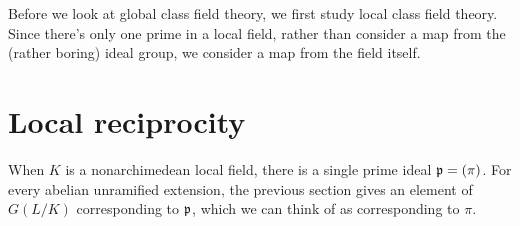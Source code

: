 Before we look at global class field theory, we first study local class field theory. Since there's only one prime in a local field, rather than consider a map from the (rather boring) ideal group, we consider a map from the field itself.
\section{Local reciprocity}
When $K$ is a nonarchimedean local field, there is a single prime ideal $\mathfrak{p}=(\pi)$. 
For every abelian unramified extension, the previous section gives an element of $G(L/K)$ corresponding to $\mathfrak{p}$, which we can think of as corresponding to $\pi$. %


